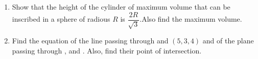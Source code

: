 \begin{enumerate}

\item Show that the height of the cylinder of  maximum volume that can be inscribed in a sphere of radious $R$ is $\dfrac{2R}{\sqrt{3}}$.Also find the maximum volume.
\item Find the equation of the line passing through  and ${(5, 3, 4)}$ and of the plane passing through ,  and . Also, find their point of intersection.      
\end{enumerate}
